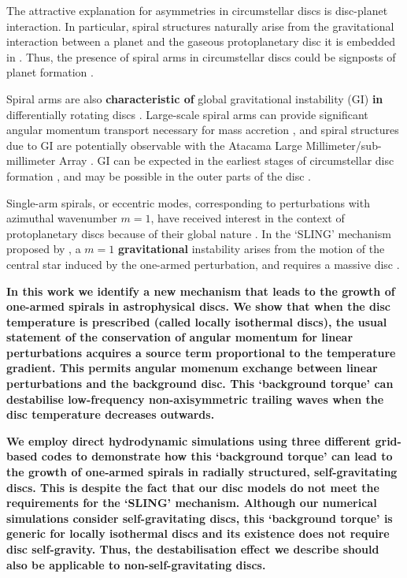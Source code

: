 \documentclass[useAMS,usenatbib]{mn2e}
\begin{document}
The attractive explanation for asymmetries in circumstellar discs is
disc-planet interaction. In particular, spiral structures  
naturally arise from the gravitational interaction between a
planet and the gaseous protoplanetary disc it is embedded in
\citep[see, e.g.][for a recent review]{baruteau13b}. Thus, the
presence of spiral arms in circumstellar discs could be signposts of 
planet formation \citep{juhasz14}.

Spiral arms are also {\bf characteristic of} global gravitational 
instability (GI) {\bf in} differentially rotating discs
\citep{goldreich65,laughlin96b,laughlin98,nelson98,lodato05,forgan11}. Large-scale 
spiral arms can provide significant angular momentum transport
necessary for mass accretion \citep{lynden-bell72,
  papaloizou91,balbus99,lodato04}, and spiral structures due to GI are
potentially observable with the Atacama Large
Millimeter/sub-millimeter Array \citep{cossins10,dipierror14}. GI can
be expected in the earliest stages of circumstellar disc formation 
\citep{kratter10b,inutsuka10,tsukamoto13}, and may be possible in the
outer parts of the disc \citep{rafikov05,matzner05,kimura12}.  

Single-arm spirals, or eccentric modes, corresponding to perturbations 
with azimuthal wavenumber $m=1$, have received interest in 
the context of protoplanetary discs because of their global nature
\citep{adams89,heemskerk92,laughlin96,tremaine01,papaloizou02,hopkins10}. 
In the `SLING' mechanism proposed by \cite{shu90}, a $m=1$ {\bf
  gravitational} instability arises from the motion of the
central star induced by the one-armed perturbation, and requires a
massive disc \citep[the former may have observable consequences,
][]{michael10}.    

{\bf
  In this work we identify a new mechanism that leads to the growth of
  one-armed spirals in astrophysical discs. We show
  that when the disc temperature is prescribed (called locally isothermal
  discs), the usual statement of the conservation of angular momentum
  for linear perturbations acquires a source term proportional to the
  temperature gradient. This permits angular momenum exchange between
  linear perturbations and the background disc. This `background
  torque' can destabilise low-frequency non-axisymmetric
  trailing waves when the disc temperature decreases outwards.       
}  

{\bf We employ direct hydrodynamic simulations using three different
  grid-based codes to demonstrate how this `background torque' 
  can lead to the growth of one-armed spirals in radially structured, 
  self-gravitating discs. This is despite the fact that our disc
  models do not meet the requirements for the `SLING' 
  mechanism. Although our numerical simulations consider
  self-gravitating discs, this `background torque' is generic for
  locally isothermal discs and its existence does not require
  disc self-gravity. Thus, the destabilisation effect we
  describe should also be applicable to non-self-gravitating discs.  
}
\end{document}
